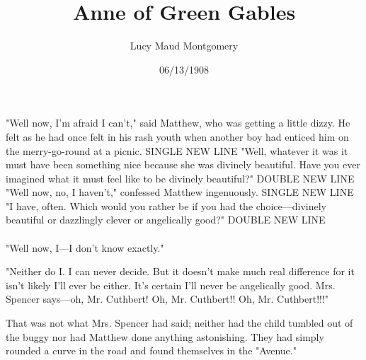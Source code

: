 \documentclass[a4paper]{article}
\title{Anne of Green Gables}
\author{Lucy Maud Montgomery}
\date{06/13/1908}
\begin{document}
\maketitle
"Well now, I'm afraid I can't," said Matthew, who was getting a little dizzy. He felt as he had once felt in his rash youth when another boy had enticed him on the merry-go-round at a picnic. SINGLE NEW LINE \newline "Well, whatever it was it must have been something nice because she was divinely beautiful. Have you ever imagined what it must feel like to be divinely beautiful?" DOUBLE NEW LINE \newline \newline "Well now, no, I haven't," confessed Matthew ingenuously. SINGLE NEW LINE\\"I have, often. Which would you rather be if you had the choice---divinely beautiful or dazzlingly clever or angelically good?" DOUBLE NEW LINE\\\\"Well now, I---I don't know exactly."

"Neither do I. I can never decide. But it doesn't make much real difference for it isn't likely I'll ever be either. It's certain I'll never be angelically good. Mrs. Spencer says---oh, Mr. Cuthbert! Oh, Mr. Cuthbert!! Oh, Mr. Cuthbert!!!"

That was not what Mrs. Spencer had said; neither had the child tumbled out of the buggy nor had Matthew done anything astonishing. They had simply rounded a curve in the road and found themselves in the "Avenue."
\end{document}
